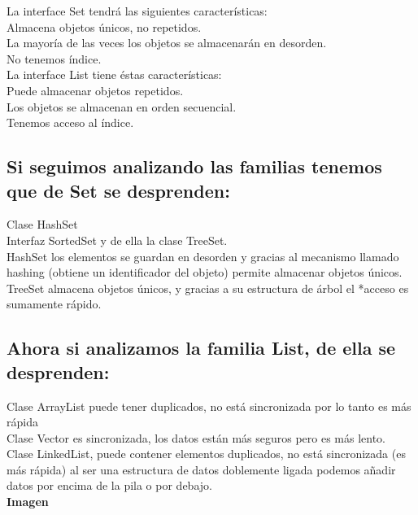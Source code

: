 \documentclass{article}
\begin{document}
La interface Set tendrá las siguientes características:\\

Almacena objetos únicos, no repetidos.\\
La mayoría de las veces los objetos se almacenarán en desorden.\\
No tenemos índice.\\

La interface List tiene éstas características:\\

Puede almacenar objetos repetidos.\\
Los objetos se almacenan en orden secuencial.\\
Tenemos acceso al índice.\\

\subsection*{Si seguimos analizando las familias tenemos que de Set se desprenden:}%
Clase HashSet\\
Interfaz SortedSet y de ella la clase TreeSet.\\

HashSet los elementos se guardan en desorden y gracias al mecanismo llamado
hashing (obtiene un identificador del objeto) permite almacenar objetos únicos.\\

TreeSet almacena objetos únicos, y gracias a su estructura de árbol el *acceso
es sumamente rápido.\\

\subsection*{Ahora si analizamos la familia List, de ella se desprenden:}%
Clase ArrayList puede tener duplicados, no está sincronizada por lo tanto es
más rápida\\
Clase Vector es sincronizada, los datos están más seguros pero es más lento.\\
Clase LinkedList, puede contener elementos duplicados, no está sincronizada (es
más rápida) al ser una estructura de datos doblemente ligada podemos añadir
datos por encima de la pila o por debajo.\\



\textbf{Imagen}\\
\end{document}

